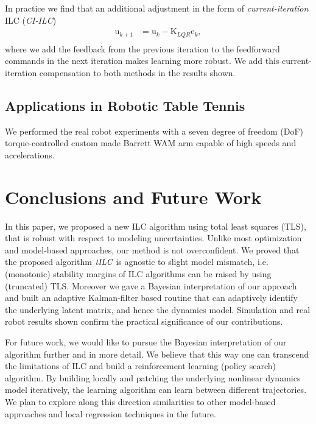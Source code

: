 \documentclass[10pt,a4paper]{article}
\theoremstyle{plain}
\theoremstyle{definition}
\newcommand{\boldvec}[1]{\boldsymbol{\mathrm{#1}}}
\let\vec\boldvec
\newcommand{\error}{\vec{e}} %
\newcommand{\sysInput}{\vec{u}} %
\newcommand{\alg}{\emph{tILC}}
\begin{document}
In practice we find that an additional adjustment in the form of \emph{current-iteration} ILC (\emph{CI-ILC}) 
%
\begin{equation}
\begin{aligned}
\sysInput_{k+1} &= \sysInput_k - \vec{K}_{LQR}\error_{k},\\
\end{aligned}
\label{fbILC}
\end{equation}
%
\noindent where we add the feedback from the previous iteration to the feedforward commands in the next iteration makes learning more robust. We add this current-iteration compensation to both methods in the results shown. 


\subsection{Applications in Robotic Table Tennis}

We performed the real robot experiments with a seven degree of freedom (DoF) torque-controlled custom made Barrett WAM arm capable of high speeds and accelerations.

\section{Conclusions and Future Work}\label{conclusions}

In this paper, we proposed a new ILC algorithm using total least squares (TLS), that is robust with respect to modeling uncertainties. Unlike most optimization and model-based approaches, our method is not overconfident. We proved that the proposed algorithm $\alg$ is agnostic to slight model mismatch, i.e. (monotonic) stability margins of ILC algorithms can be raised by using (truncated) TLS. Moreover we gave a Bayesian interpretation of our approach and built an adaptive Kalman-filter based routine that can adaptively identify the underlying latent matrix, and hence the dynamics model. Simulation and real robot results shown confirm the practical significance of our contributions. %

For future work, we would like to pursue the Bayesian interpretation of our algorithm further and in more detail. We believe that this way one can transcend the limitations of ILC and build a reinforcement learning (policy search) algorithm. By building locally and patching the underlying nonlinear dynamics model iteratively, the learning algorithm can learn between different trajectories. We plan to explore along this direction similarities to other model-based approaches and local regression techniques in the future.


%
%

\end{document}
